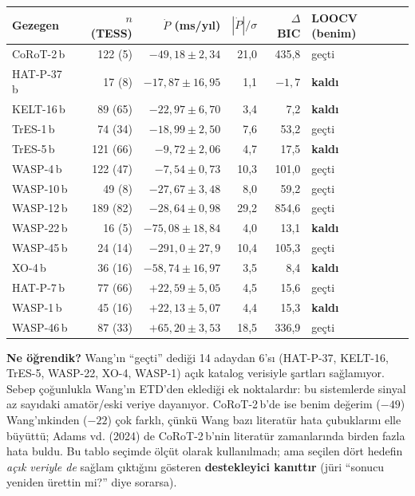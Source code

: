 \begin{center}
\small
\begin{tabular}{l r r r r l}
\toprule
Gezegen & $n$ (TESS) & $\dot P$ (ms/yıl) & $|\dot P|/\sigma$ & $\Delta$BIC & LOOCV (benim)\\
\midrule
CoRoT-2\,b  & 122 (5)  & $-49{,}18\pm2{,}34$  & 21,0 & 435,8 & geçti\\
HAT-P-37\,b & 17 (8)   & $-17{,}87\pm16{,}95$ & 1,1  & $-1{,}7$ & \textbf{kaldı}\\
KELT-16\,b  & 89 (65)  & $-22{,}97\pm6{,}70$  & 3,4  & 7,2   & \textbf{kaldı}\\
TrES-1\,b   & 74 (34)  & $-18{,}99\pm2{,}50$  & 7,6  & 53,2  & geçti\\
TrES-5\,b   & 121 (66) & $-9{,}72\pm2{,}06$   & 4,7  & 17,5  & \textbf{kaldı}\\
WASP-4\,b   & 122 (47) & $-7{,}54\pm0{,}73$   & 10,3 & 101,0 & geçti\\
WASP-10\,b  & 49 (8)   & $-27{,}67\pm3{,}48$  & 8,0  & 59,2  & geçti\\
WASP-12\,b  & 189 (82) & $-28{,}64\pm0{,}98$  & 29,2 & 854,6 & geçti\\
WASP-22\,b  & 16 (5)   & $-75{,}08\pm18{,}84$ & 4,0  & 13,1  & \textbf{kaldı}\\
WASP-45\,b  & 24 (14)  & $-291{,}0\pm27{,}9$  & 10,4 & 105,3 & geçti\\
XO-4\,b     & 36 (16)  & $-58{,}74\pm16{,}97$ & 3,5  & 8,4   & \textbf{kaldı}\\
HAT-P-7\,b  & 77 (66)  & $+22{,}59\pm5{,}05$  & 4,5  & 15,6  & geçti\\
WASP-1\,b   & 45 (16)  & $+22{,}13\pm5{,}07$  & 4,4  & 15,3  & \textbf{kaldı}\\
WASP-46\,b  & 87 (33)  & $+65{,}20\pm3{,}53$  & 18,5 & 336,9 & geçti\\
\bottomrule
\end{tabular}
\end{center}

\textbf{Ne öğrendik?} Wang'ın “geçti” dediği 14 adaydan 6'sı (HAT-P-37, KELT-16, TrES-5, WASP-22, XO-4, WASP-1)
açık katalog verisiyle şartları sağlamıyor. Sebep çoğunlukla Wang'ın ETD'den eklediği ek noktalardır: bu
sistemlerde sinyal az sayıdaki amatör/eski veriye dayanıyor. CoRoT-2\,b'de ise benim değerim ($-49$) Wang'ınkinden
($-22$) çok farklı, çünkü Wang bazı literatür hata çubuklarını elle büyüttü; Adams vd. (2024) de CoRoT-2\,b'nin
literatür zamanlarında birden fazla hata buldu. Bu tablo seçimde ölçüt olarak kullanılmadı; ama seçilen dört hedefin \emph{açık veriyle de} sağlam
çıktığını gösteren \textbf{destekleyici kanıttır} (jüri “sonucu yeniden ürettin mi?” diye sorarsa).

